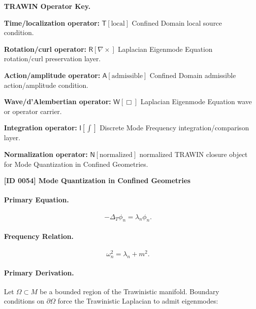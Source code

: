 \par\vspace{0.45\baselineskip}
\noindent\begin{minipage}[t]{\linewidth}
\begingroup
\small
\raggedright
\textbf{TRAWIN Operator Key.}\par
\noindent\textbf{Time/localization operator:} $\mathsf{T}\!\left[\mathrm{local}\right]$ Confined Domain local source condition.\par
\noindent\textbf{Rotation/curl operator:} $\mathsf{R}\!\left[\nabla\times\right]$ Laplacian Eigenmode Equation rotation/curl preservation layer.\par
\noindent\textbf{Action/amplitude operator:} $\mathsf{A}\!\left[\mathrm{admissible}\right]$ Confined Domain admissible action/amplitude condition.\par
\noindent\textbf{Wave/d'Alembertian operator:} $\mathsf{W}\!\left[\Box\right]$ Laplacian Eigenmode Equation wave or operator carrier.\par
\noindent\textbf{Integration operator:} $\mathsf{I}\!\left[\int\right]$ Discrete Mode Frequency integration/comparison layer.\par
\noindent\textbf{Normalization operator:} $\mathsf{N}\!\left[\mathrm{normalized}\right]$ normalized TRAWIN closure object for Mode Quantization in Confined Geometries.\par
\endgroup
\end{minipage}

\clearpage
\noindent\textbf{[ID 0054] Mode Quantization in Confined Geometries}\par
\vspace{0.35em}
\paragraph{Primary Equation.}
\begin{equation}
-\Delta_T \phi_n = \lambda_n \phi_n .
\end{equation}

\paragraph{Frequency Relation.}
\begin{equation}
\omega_n^2 = \lambda_n + m^2 .
\end{equation}

\paragraph{Primary Derivation.}
Let $\Omega\subset M$ be a bounded region of the Trawinistic manifold.  
Boundary conditions on $\partial\Omega$ force the Trawinistic Laplacian to admit eigenmodes:

